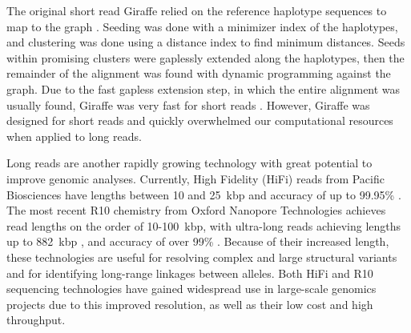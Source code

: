 \documentclass[11pt]{ucscthesis}
\begin{document}
The original short read Giraffe relied on the reference haplotype sequences to map to the graph \cite{sr_giraffe_2021}.
Seeding was done with a minimizer index of the haplotypes, and clustering was done using a distance index to find minimum distances.
Seeds within promising clusters were gaplessly extended along the haplotypes, then the remainder of the alignment was found with dynamic programming against the graph.
Due to the fast gapless extension step, in which the entire alignment was usually found, Giraffe was very fast for short reads \cite{sr_giraffe_2021}.
However, Giraffe was designed for short reads and quickly overwhelmed our computational resources when applied to long reads.

Long reads are another rapidly growing technology with great potential to improve genomic analyses.
Currently, High Fidelity (HiFi) reads from Pacific Biosciences have lengths between 10 and 25~kbp and accuracy of up to 99.95\% \cite{pacbio_2019,lr_review_2023}.
The most recent R10 chemistry from Oxford Nanopore Technologies achieves read lengths on the order of 10-100~kbp, with ultra-long reads achieving lengths up to 882~kbp \cite{nanopore_ultralong_2018}, and accuracy of over 99\% \cite{nanopore-fly-accuracy_2024, damaraju_long-read_2024}.
Because of their increased length, these technologies are useful for resolving complex and large structural variants and for identifying long-range linkages between alleles.
Both HiFi and R10 sequencing technologies have gained widespread use in large-scale genomics projects \citep{kolmogorov_card_2023, lr_all_of_us_2024} due to this improved resolution, as well as their low cost and high throughput.
\end{document}
